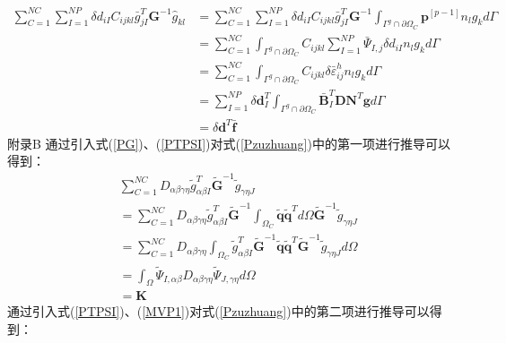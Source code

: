 \begin{equation}\label{CH4-barf}
\begin{split}
    \sum_{C=1}^{N\!C}\sum_{I=1}^{N\!P}\delta d_{iI}C_{ijkl}\bar{g}^T_{jI}\pmb{G}^{-1}\hat{g}_{kl}
    &=\sum_{C=1}^{N\!C}\sum_{I=1}^{N\!P}\delta d_{iI}C_{ijkl}\bar{g}^T_{jI}\pmb{G}^{-1}\int_{\Gamma^g\cap\partial\Omega_C}\pmb{p}^{[p-1]}n_lg_kd\Gamma\\
    &=\sum_{C=1}^{N\!C}\int_{\Gamma^g\cap\partial\Omega_C}C_{ijkl}\sum_{I=1}^{N\!P}\bar{\Psi}_{I,j}\delta d_{iI}n_lg_kd\Gamma\\
    &=\sum_{C=1}^{N\!C}\int_{\Gamma^g\cap\partial\Omega_C}C_{ijkl}\delta\bar{\varepsilon}_{ij}^hn_lg_kd\Gamma\\
    &=\sum_{I=1}^{N\!P}\delta\pmb{d}_I^T\int_{\Gamma^g\cap\partial\Omega_C}\bar{\pmb{B}}_I^T\pmb{D}\pmb{N}^T\pmb{g}d\Gamma\\
    &=\delta\pmb{d}^T\bar{\pmb f}
\end{split}
\end{equation}
\newpage
附录B
通过引入式(\ref{PG})、(\ref{PTPSI})对式(\ref{Pzuzhuang})中的第一项进行推导可以得到：
\begin{equation}
\begin{split}
    &\sum_{C=1}^{N\!C}D_{\alpha\beta\gamma\eta}\tilde{g}_{\alpha\beta I}^T\tilde{\pmb G}^{-1}\tilde{g}_{\gamma\eta J}\\
    &=\sum_{C=1}^{N\!C}D_{\alpha\beta\gamma\eta}\tilde{g}_{\alpha\beta I}^T\tilde{\pmb G}^{-1}\int_{\Omega_C}\tilde{\pmb q}\tilde{\pmb q}^Td\Omega\tilde{\pmb G}^{-1}\tilde{g}_{\gamma\eta J}\\
    &=\sum_{C=1}^{N\!C}D_{\alpha\beta\gamma\eta}\int_{\Omega_C}\tilde{g}_{\alpha\beta I}^T\tilde{\pmb G}^{-1}\tilde{\pmb q}\tilde{\pmb q}^T\tilde{\pmb G}^{-1}\tilde{g}_{\gamma\eta J}d\Omega \\
    &=\int_{\Omega}\tilde{\Psi}_{I,\alpha\beta}D_{\alpha\beta\gamma\eta}\tilde{\Psi}_{J,\gamma\eta}d\Omega \\
    &=\pmb{K}
\end{split}
\end{equation}
\newpage
通过引入式(\ref{PTPSI})、(\ref{MVP1})对式(\ref{Pzuzhuang})中的第二项进行推导可以得到：
